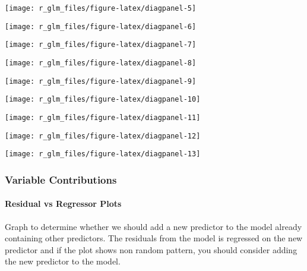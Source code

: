 \documentclass[
]{article}
\begin{document}
\begin{center}\texttt{[image: r\_glm\_files/figure-latex/diagpanel-5]} \end{center}

\begin{center}\texttt{[image: r\_glm\_files/figure-latex/diagpanel-6]} \end{center}

\begin{center}\texttt{[image: r\_glm\_files/figure-latex/diagpanel-7]} \end{center}

\begin{center}\texttt{[image: r\_glm\_files/figure-latex/diagpanel-8]} \end{center}

\begin{center}\texttt{[image: r\_glm\_files/figure-latex/diagpanel-9]} \end{center}

\begin{center}\texttt{[image: r\_glm\_files/figure-latex/diagpanel-10]} \end{center}

\begin{center}\texttt{[image: r\_glm\_files/figure-latex/diagpanel-11]} \end{center}

\begin{center}\texttt{[image: r\_glm\_files/figure-latex/diagpanel-12]} \end{center}

\begin{center}\texttt{[image: r\_glm\_files/figure-latex/diagpanel-13]} \end{center}

\hypertarget{variable-contributions}{%
\subsubsection{Variable Contributions}\label{variable-contributions}}

\hypertarget{residual-vs-regressor-plots}{%
\paragraph{Residual vs Regressor
Plots}\label{residual-vs-regressor-plots}}

Graph to determine whether we should add a new predictor to the model
already containing other predictors. The residuals from the model is
regressed on the new predictor and if the plot shows non random pattern,
you should consider adding the new predictor to the model.
\end{document}
